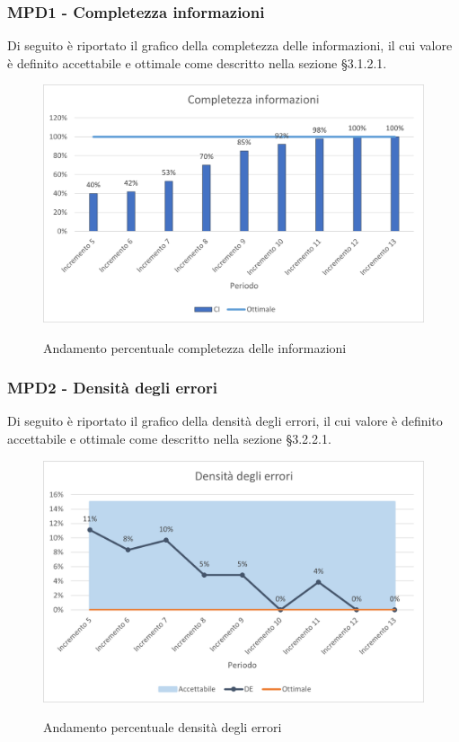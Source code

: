 \subsubsection{MPD1 - Completezza informazioni}
Di seguito è riportato il grafico della completezza delle informazioni, il cui valore è definito accettabile e ottimale come descritto nella sezione §3.1.2.1.\\

\begin{figure}[H]
\centering
\includegraphics[scale=0.78]{res/ResocontoAttivitaDiVerifica/res/metriche/grafici/img/CompletezzaInformazioni.png}\\
\caption{Andamento percentuale completezza delle informazioni}
\end{figure}


\subsubsection{MPD2 - Densità degli errori}
Di seguito è riportato il grafico della densità degli errori, il cui valore è definito accettabile e ottimale come descritto nella sezione §3.2.2.1.\\

\begin{figure}[H]
\centering
\includegraphics[scale=0.78]{res/ResocontoAttivitaDiVerifica/res/metriche/grafici/img/DensitaErrori.png}\\
\caption{Andamento percentuale densità degli errori}
\end{figure}


